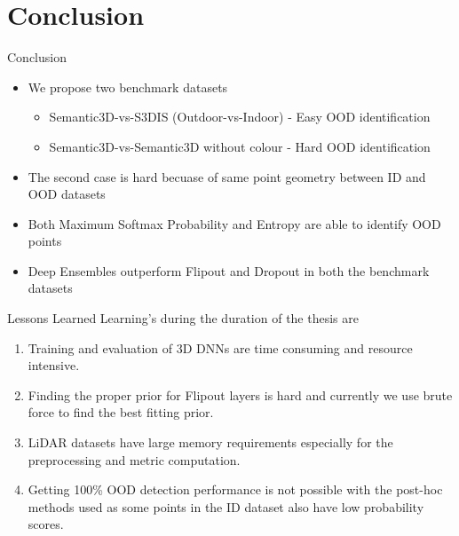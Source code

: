 \documentclass[aspectratio=169]{beamer}
\begin{document}
\section{Conclusion}
\begin{frame}{Conclusion}
    \begin{itemize}
        \item We propose two benchmark datasets 
        \begin{itemize}
            \item Semantic3D-vs-S3DIS (Outdoor-vs-Indoor) - Easy OOD identification
            \item Semantic3D-vs-Semantic3D without colour - Hard OOD identification
        \end{itemize}
        \item The second case is hard becuase of same point geometry between ID and OOD datasets
        \item Both Maximum Softmax Probability and Entropy are able to identify OOD points
        \item Deep Ensembles outperform Flipout and Dropout in both the benchmark datasets
    \end{itemize}
\end{frame}
\begin{frame}{Lessons Learned}
    Learning's during the duration of the thesis are
    \begin{enumerate}
        \item Training and evaluation of 3D DNNs are time consuming and resource intensive.
        \item Finding the proper prior for Flipout layers is hard and currently we use brute force to find the best fitting prior.
        \item LiDAR datasets have large memory requirements especially for the preprocessing and metric computation.
        \item Getting 100\% OOD detection performance is not possible with the post-hoc methods used as some points in the ID dataset also have low probability scores.
    \end{enumerate}
\end{frame}
\end{document}
